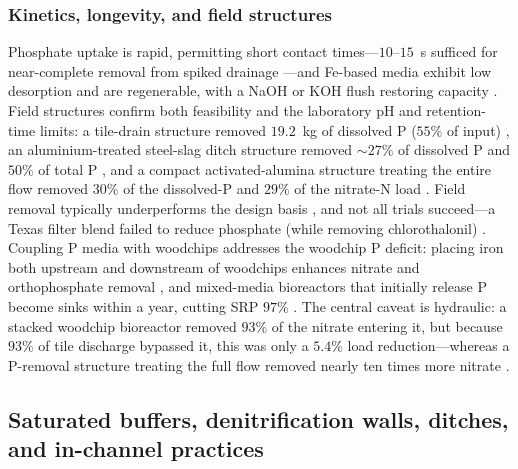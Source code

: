 \documentclass[11pt]{article}
\begin{document}
\subsubsection{Kinetics, longevity, and field structures}

Phosphate uptake is rapid, permitting short contact times---$10$--$15$~s
sufficed for near-complete removal from spiked drainage
\parencite{Allred2017}---and Fe-based media exhibit low desorption and are
regenerable, with a NaOH or KOH flush restoring capacity
\parencite{Allred2014,Allred2017,Kumari2025,Sellner2019b}. Field structures
confirm both feasibility and the laboratory pH and retention-time limits: a
tile-drain structure removed $19.2$~kg of dissolved P ($55\%$ of input)
\parencite{Penn2020}, an aluminium-treated steel-slag ditch structure removed
$\sim27\%$ of dissolved P and $50\%$ of total P \parencite{Shedekar2020}, and
a compact activated-alumina structure treating the entire flow removed $30\%$
of the dissolved-P and $29\%$ of the nitrate-N load
\parencite{Penn2024}. Field removal typically underperforms the design basis
\parencite{Shedekar2020}, and not all trials succeed---a Texas filter blend
failed to reduce phosphate (while removing chlorothalonil)
\parencite{Agrawal2011b}. Coupling P media with woodchips addresses the
woodchip P deficit: placing iron both upstream and downstream of woodchips
enhances nitrate and orthophosphate removal
\parencite{Goodwin2015,Hua2016,Li2018b,Oladeji2023}, and mixed-media
bioreactors that initially release P become sinks within a year, cutting SRP
$97\%$ \parencite{Husk2018,Zhang2024b}. The central caveat is hydraulic: a
stacked woodchip bioreactor removed $93\%$ of the nitrate entering it, but
because $93\%$ of tile discharge bypassed it, this was only a $5.4\%$ load
reduction---whereas a P-removal structure treating the full flow removed
nearly ten times more nitrate \parencite{Penn2024}.

\subsection{Saturated buffers, denitrification walls, ditches, and in-channel practices}
\end{document}
